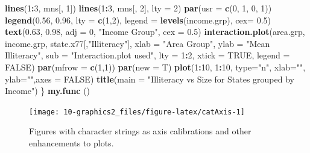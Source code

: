 \documentclass[
]{book}
\newenvironment{Shaded}{\begin{snugshade}}{\end{snugshade}}
\newcommand{\AttributeTok}[1]{\textcolor[rgb]{0.13,0.29,0.53}{#1}}
\newcommand{\ConstantTok}[1]{\textcolor[rgb]{0.56,0.35,0.01}{#1}}
\newcommand{\DecValTok}[1]{\textcolor[rgb]{0.00,0.00,0.81}{#1}}
\newcommand{\FloatTok}[1]{\textcolor[rgb]{0.00,0.00,0.81}{#1}}
\newcommand{\FunctionTok}[1]{\textcolor[rgb]{0.13,0.29,0.53}{\textbf{#1}}}
\newcommand{\NormalTok}[1]{#1}
\newcommand{\SpecialCharTok}[1]{\textcolor[rgb]{0.81,0.36,0.00}{\textbf{#1}}}
\newcommand{\StringTok}[1]{\textcolor[rgb]{0.31,0.60,0.02}{#1}}
\begin{document}
\begin{Shaded}
\begin{Highlighting}[]
  \FunctionTok{lines}\NormalTok{(}\DecValTok{1}\SpecialCharTok{:}\DecValTok{3}\NormalTok{, mns[, }\DecValTok{1}\NormalTok{])}
  \FunctionTok{lines}\NormalTok{(}\DecValTok{1}\SpecialCharTok{:}\DecValTok{3}\NormalTok{, mns[, }\DecValTok{2}\NormalTok{], }\AttributeTok{lty =} \DecValTok{2}\NormalTok{)}
  \FunctionTok{par}\NormalTok{(}\AttributeTok{usr =} \FunctionTok{c}\NormalTok{(}\DecValTok{0}\NormalTok{, }\DecValTok{1}\NormalTok{, }\DecValTok{0}\NormalTok{, }\DecValTok{1}\NormalTok{))}
  \FunctionTok{legend}\NormalTok{(}\FloatTok{0.56}\NormalTok{, }\FloatTok{0.96}\NormalTok{, }\AttributeTok{lty =} \FunctionTok{c}\NormalTok{(}\DecValTok{1}\NormalTok{,}\DecValTok{2}\NormalTok{), }\AttributeTok{legend =} \FunctionTok{levels}\NormalTok{(income.grp), }\AttributeTok{cex=} \FloatTok{0.5}\NormalTok{)}
  \FunctionTok{text}\NormalTok{(}\FloatTok{0.63}\NormalTok{, }\FloatTok{0.98}\NormalTok{, }\AttributeTok{adj =} \DecValTok{0}\NormalTok{, }\StringTok{"Income Group"}\NormalTok{, }\AttributeTok{cex =} \FloatTok{0.5}\NormalTok{)}
    \FunctionTok{interaction.plot}\NormalTok{(area.grp, income.grp, state.x77[,}\StringTok{"Illiteracy"}\NormalTok{], }
                     \AttributeTok{xlab =} \StringTok{"Area Group"}\NormalTok{, }\AttributeTok{ylab =} \StringTok{"Mean Illiteracy"}\NormalTok{, }
                     \AttributeTok{sub =} \StringTok{"Interaction.plot used"}\NormalTok{, }\AttributeTok{lty =} \DecValTok{1}\SpecialCharTok{:}\DecValTok{2}\NormalTok{, }\AttributeTok{xtick =} \ConstantTok{TRUE}\NormalTok{, }
                     \AttributeTok{legend =} \ConstantTok{FALSE}\NormalTok{)}
  \FunctionTok{par}\NormalTok{(}\AttributeTok{mfrow =} \FunctionTok{c}\NormalTok{(}\DecValTok{1}\NormalTok{,}\DecValTok{1}\NormalTok{))}
  \FunctionTok{par}\NormalTok{(}\AttributeTok{new =}\NormalTok{ T)}
  \FunctionTok{plot}\NormalTok{(}\DecValTok{1}\SpecialCharTok{:}\DecValTok{10}\NormalTok{, }\DecValTok{1}\SpecialCharTok{:}\DecValTok{10}\NormalTok{, }\AttributeTok{type=}\StringTok{"n"}\NormalTok{, }\AttributeTok{xlab=}\StringTok{""}\NormalTok{, }\AttributeTok{ylab=}\StringTok{""}\NormalTok{,}\AttributeTok{axes =} \ConstantTok{FALSE}\NormalTok{)}
  \FunctionTok{title}\NormalTok{(}\AttributeTok{main =} \StringTok{"Illiteracy vs Size for States grouped by Income"}\NormalTok{)}
\NormalTok{\}}
\FunctionTok{my.func}\NormalTok{ ()}
\end{Highlighting}
\end{Shaded}

\begin{figure}
\texttt{[image: 10-graphics2\_files/figure-latex/catAxis-1]} \caption{Figures with character strings as axis calibrations and other enhancements to plots.}\label{fig:catAxis}
\end{figure}
\end{document}
